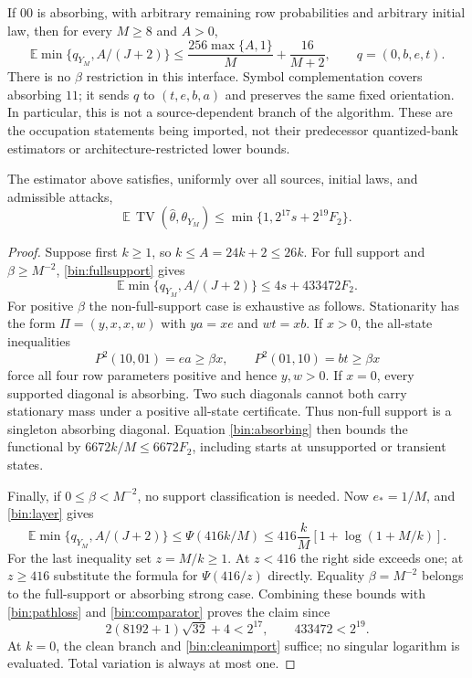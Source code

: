 If $00$ is absorbing, with arbitrary remaining row probabilities and arbitrary initial law, then for every $M\ge8$ and $A>0$,
\begin{equation}
 \mathbb E\min\{q_{Y_M},A/(J+2)\}
 \le\frac{256\max\{A,1\}}M+\frac{16}{M+2},
 \qquad q=(0,b,e,t).
 \label{bin:absorbing}
\end{equation}
There is no $\beta$ restriction in this interface. Symbol complementation covers absorbing $11$; it sends $q$ to $(t,e,b,a)$ and preserves the same fixed orientation. In particular, this is not a source-dependent branch of the algorithm. These are the occupation statements being imported, not their predecessor quantized-bank estimators or architecture-restricted lower bounds.

\begin{proposition}
\label{bin:upperprop}
The estimator above satisfies, uniformly over all sources, initial laws, and admissible attacks,
\[
 \mathbb E\,\operatorname{TV}(\widehat\theta,\theta_{Y_M})
 \le\min\{1,2^{17}s+2^{19}F_2\}.
\]
\end{proposition}
\begin{proof}
Suppose first $k\ge1$, so $k\le A=24k+2\le26k$. For full support and $\beta\ge M^{-2}$, \eqref{bin:fullsupport} gives
\[
 \mathbb E\min\{q_{Y_M},A/(J+2)\}\le4s+433472F_2.
\]
For positive $\beta$ the non-full-support case is exhaustive as follows. Stationarity has the form $\Pi=(y,x,x,w)$ with $ya=xe$ and $wt=xb$. If $x>0$, the all-state inequalities
\[
 P^2(10,01)=ea\ge\beta x,\qquad P^2(01,10)=bt\ge\beta x
\]
force all four row parameters positive and hence $y,w>0$. If $x=0$, every supported diagonal is absorbing. Two such diagonals cannot both carry stationary mass under a positive all-state certificate. Thus non-full support is a singleton absorbing diagonal. Equation \eqref{bin:absorbing} then bounds the functional by $6672k/M\le6672F_2$, including starts at unsupported or transient states.

Finally, if $0\le\beta<M^{-2}$, no support classification is needed. Now $e_*=1/M$, and \eqref{bin:layer} gives
\[
 \mathbb E\min\{q_{Y_M},A/(J+2)\}
 \le\Psi(416k/M)\le416\frac{k}{M}[1+\log(1+M/k)].
\]
For the last inequality set $z=M/k\ge1$. At $z<416$ the right side exceeds one; at $z\ge416$ substitute the formula for $\Psi(416/z)$ directly. Equality $\beta=M^{-2}$ belongs to the full-support or absorbing strong case. Combining these bounds with \eqref{bin:pathloss} and \eqref{bin:comparator} proves the claim since
\[
 2(8192+1)\sqrt{32}+4<2^{17},\qquad433472<2^{19}.
\]
At $k=0$, the clean branch and \eqref{bin:cleanimport} suffice; no singular logarithm is evaluated. Total variation is always at most one.
\end{proof}

